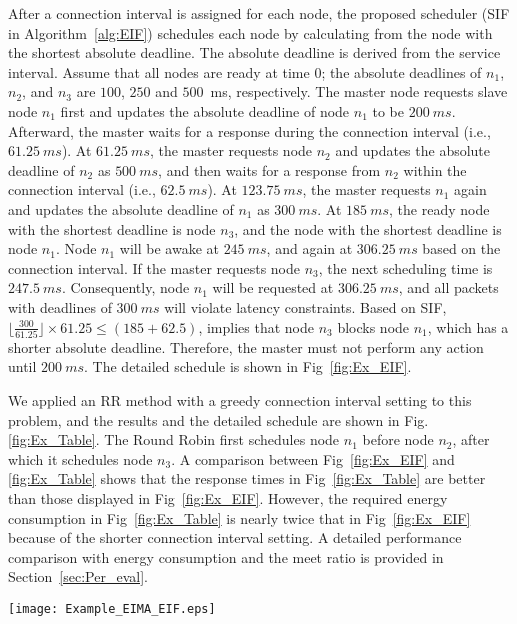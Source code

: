 \documentclass[10pt,journal,compsoc]{IEEEtran}
\begin{document}
After a connection interval is assigned for each node, the proposed scheduler (SIF in Algorithm~\ref{alg:EIF}) schedules each node by calculating from the node with the shortest absolute deadline. The absolute deadline is derived from the service interval. Assume that all nodes are ready at time $0$; the absolute deadlines of $n_1$, $n_2$, and $n_3$ are $100$, $250$ and $500$~ms, respectively. The master node requests slave node $n_1$ first and updates the absolute deadline of node $n_1$ to be $200~ms$. Afterward, the master waits for a response during the connection interval (i.e., $61.25~ms$). At $61.25~ms$, the master requests node $n_2$ and updates the absolute deadline of $n_2$ as $500~ms$, and then waits for a response from $n_2$ within the connection interval (i.e., $62.5~ms$). At $123.75~ms$, the master requests $n_1$ again and updates the absolute deadline of $n_1$ as $300~ms$. At $185~ms$, the ready node with the shortest deadline is node $n_3$, and the node with the shortest deadline is node $n_1$. Node $n_1$ will be awake at $245~ms$, and again at $306.25~ms$ based on the connection interval. If the master requests node $n_3$, the next scheduling time is $247.5~ms$. Consequently, node $n_1$ will be requested at $306.25~ms$, and all packets with deadlines of $300~ms$ will violate latency constraints. Based on SIF, $\lfloor \frac{300}{61.25} \rfloor \times 61.25 \leq (185 + 62.5)$, implies that node $n_3$ blocks node $n_1$, which has a shorter absolute deadline. Therefore, the master must not perform any action until $200~ms$. The detailed schedule is shown in Fig~\ref{fig:Ex_EIF}.



We applied an RR method with a greedy connection interval setting to this problem, and the results and the detailed schedule are shown in Fig. \ref{fig:Ex_Table}. The Round Robin first schedules node $n_1$ before node $n_2$, after which it schedules node $n_3$.
A comparison between Fig~\ref{fig:Ex_EIF} and \ref{fig:Ex_Table} shows that the response times in Fig~\ref{fig:Ex_Table} are better than those displayed in Fig~\ref{fig:Ex_EIF}. However, the required energy consumption in Fig~\ref{fig:Ex_Table} is nearly twice that in Fig~\ref{fig:Ex_EIF} because of the shorter connection interval setting. A detailed performance comparison with energy consumption and the meet ratio is provided in Section~\ref{sec:Per_eval}.

\begin{figure*}[!tbhp]
\begin{minipage}[b]{\linewidth}
\centering
\texttt{[image: Example\_EIMA\_EIF.eps]}
\caption{EIMA with SIF Scheduler}\label{fig:Ex_EIF}
\end{minipage}
\end{figure*}
\end{document}

